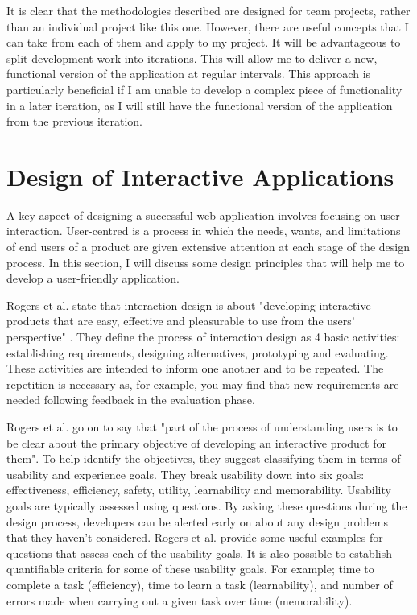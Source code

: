 \documentclass[authoryearcitations]{UoYCSproject}
\begin{document}
It is clear that the methodologies described are designed for team projects, rather than an individual project like this one. However, there are useful concepts that I can take from each of them and apply to my project. It will be advantageous to split development work into iterations. This will allow me to deliver a new, functional version of the application at regular intervals. This approach is particularly beneficial if I am unable to develop a complex piece of functionality in a later iteration, as I will still have the functional version of the application from the previous iteration. 


\section{Design of Interactive Applications}

A key aspect of designing a successful web application involves focusing on user interaction. User-centred is a process in which the needs, wants, and limitations of end users of a product are given extensive attention at each stage of the design process. In this section, I will discuss some design principles that will help me to develop a user-friendly application. 

Rogers et al. state that interaction design is about "developing interactive products that are easy, effective and pleasurable to use from the users' perspective" \citep{Rogers2011}. They define the process of interaction design as 4 basic activities: establishing requirements, designing alternatives, prototyping and evaluating. These activities are intended to inform one another and to be repeated. The repetition is necessary as, for example, you may find that new requirements are needed following feedback in the evaluation phase.

Rogers et al. go on to say that "part of the process of understanding users is to be clear about the primary objective of  developing an interactive product for them". To help identify the objectives, they suggest classifying them in terms of usability and experience goals. They break usability down into six goals: effectiveness, efficiency, safety, utility, learnability and memorability. Usability goals are typically assessed using questions. By asking these questions during the design process, developers can be alerted early on about any design problems that they haven't considered. Rogers et al. provide some useful examples for questions that assess each of the usability goals. It is also possible to establish quantifiable criteria for some of these usability goals. For example; time to complete a task (efficiency), time to learn a task (learnability), and number of errors made when carrying out a given task over time (memorability). 
\end{document}
